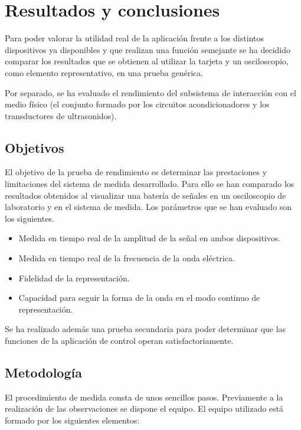 \chapter{Resultados y conclusiones}\label{chap:part1conclusions}

Para poder valorar la utilidad real de la aplicación frente a los distintos
dispositivos ya disponibles y que realizan una función semejante se ha
decidido comparar los resultados que se obtienen al utilizar la tarjeta y
un osciloscopio, como elemento representativo, en una prueba genérica.

Por separado, se ha evaluado el rendimiento del subsistema de interacción
con el medio físico (el conjunto formado por los circuitos acondicionadores
y los transductores de ultrasonidos).


\section{Objetivos}

El objetivo de la prueba de rendimiento es determinar las prestaciones y
limitaciones del sistema de medida desarrollado. Para ello se han comparado
los resultados obtenidos al visualizar una batería de señales en un
osciloscopio de laboratorio y en el sistema de medida. Los parámetros que
se han evaluado son los siguientes.

\begin{itemize}
    \item Medida en tiempo real de la amplitud de la señal en ambos
	dispositivos.
    \item Medida en tiempo real de la frecuencia de la onda eléctrica.
    \item Fidelidad de la representación.
    \item Capacidad para seguir la forma de la onda en el modo continuo de
	representación.
\end{itemize}

Se ha realizado además una prueba secundaria para poder determinar que las
funciones de la aplicación de control operan satisfactoriamente.


\section{Metodología}\label{sec:working-test}

El procedimiento de medida consta de unos sencillos pasos. Previamente a la
realización de las observaciones se dispone el equipo. El equipo utilizado
está formado por los siguientes elementos:

